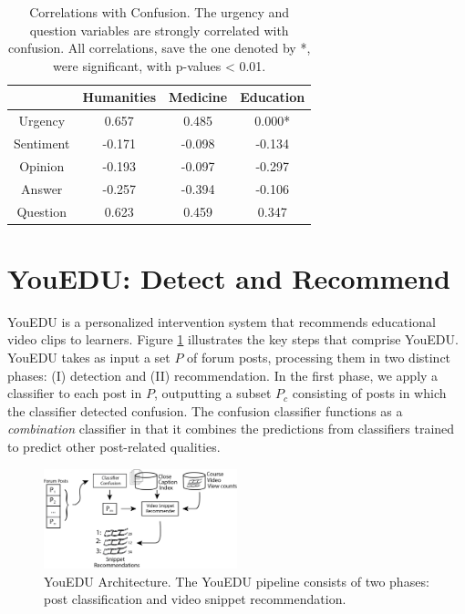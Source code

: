 \documentclass{edm_template}
\begin{document}
\begin{table}
       \centering
       \begin{tabular}{|c|c|c|c|}
       \hline
          & Humanities & Medicine & Education \\ \hline
        Urgency   & 0.657                & 0.485              & 0.000* \\ \hline
        Sentiment & -0.171                & -0.098             & -0.134 \\ \hline
        Opinion   & -0.193                & -0.097             & -0.297 \\ \hline
        Answer    & -0.257                & -0.394             & -0.106  \\ \hline
        Question  & 0.623                & 0.459              & 0.347  \\ \hline
       \end{tabular}
       \caption{\textnormal{
       Correlations with Confusion. The urgency and question variables are strongly correlated with confusion. All correlations, save the one denoted by *, were significant, with p-values < 0.01.
       }} 
       \label{table:correlations} %
\end{table}

\section{YouEDU: Detect and Recommend}
\label{sec:arch}

YouEDU is a personalized intervention system that recommends educational video clips to learners. Figure \ref{figure:architecture} illustrates the key steps that comprise YouEDU. YouEDU takes as input a set $P$ of forum posts, processing them in two distinct phases: (I) detection and (II) recommendation. In the first phase, we apply a classifier to each post in $P$, outputting a subset $P_{c}$ consisting of posts in which the classifier detected confusion. The confusion classifier functions as a \emph{combination} classifier in that it combines the predictions from classifiers trained to predict other post-related qualities.

\begin{figure}[ht]
       \centering
       \includegraphics[width=0.5\textwidth]{../Figs/youEduArch.png}
       \caption{\textnormal{YouEDU Architecture. The YouEDU pipeline consists of two phases: post classification and video snippet recommendation.}}
       \label{figure:architecture}
\end{figure}
\end{document}
